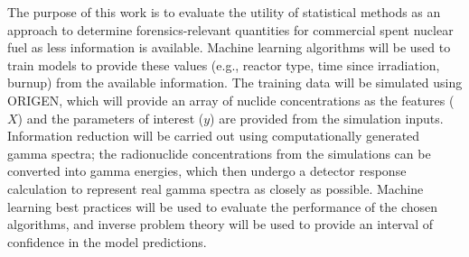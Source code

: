 The purpose of this work is to evaluate the utility of statistical methods as
an approach to determine forensics-relevant quantities for commercial spent
nuclear fuel as less information is available. Machine learning algorithms will
be used to train models to provide these values (e.g., reactor type, time since
irradiation, burnup) from the available information. The training data will be
simulated using ORIGEN, which will provide an array of nuclide concentrations
as the features ($X$) and the parameters of interest ($y$) are provided from the
simulation inputs. Information reduction will be carried out using
computationally generated gamma spectra; the radionuclide concentrations from
the simulations can be converted into gamma energies, which then undergo a
detector response calculation to represent real gamma spectra as closely as
possible. Machine learning best practices will be used to evaluate the
performance of the chosen algorithms, and inverse problem theory will be used
to provide an interval of confidence in the model predictions. 
